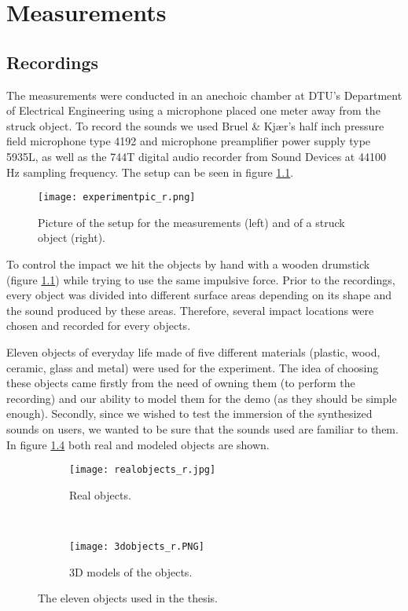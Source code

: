 \chapter{Measurements}\label{ch:measurements}

\section{Recordings}\label{sec:recordings}

The measurements were conducted in an anechoic chamber at DTU's Department of Electrical Engineering using a microphone placed one meter away from the struck object. To record the sounds we used Bruel \& Kjær's half inch pressure field microphone type 4192 and microphone preamplifier power supply type 5935L, as well as the 744T digital audio recorder from Sound Devices at 44100 Hz sampling frequency. The setup can be seen in figure \ref{fig:experiment}.

\begin{figure}[H]
  \centering
    \texttt{[image: experimentpic\_r.png]}
      \caption{Picture of the setup for the measurements (left) and of a struck object (right).}\label{fig:experiment}
\end{figure}

To control the impact we hit the objects by hand with a wooden drumstick (figure \ref{fig:experiment}) while trying to use the same impulsive force. Prior to the recordings, every object was divided into different surface areas depending on its shape and the sound produced by these areas. Therefore, several impact locations were chosen and recorded for every objects.

Eleven objects of everyday life made of five different materials (plastic, wood, ceramic, glass and metal) were used for the experiment. The idea of choosing these objects came firstly from the need of owning them (to perform the recording) and our ability to model them for the demo (as they should be simple enough). Secondly, since we wished to test the immersion of the synthesized sounds on users, we wanted to be sure that the sounds used are familiar to them. In figure \ref{fig:objects} both real and modeled objects are shown. 

\begin{figure}[H]
    \centering
    \begin{subfigure}[b]{0.7\textwidth}
        \texttt{[image: realobjects\_r.jpg]}
        \caption{Real objects.}
        \label{fig:real}
    \end{subfigure}
    ~ %
    \begin{subfigure}[b]{0.7\textwidth}
        \texttt{[image: 3dobjects\_r.PNG]}
        \caption{3D models of the objects.}
        \label{fig:models}
    \end{subfigure}
    \caption{The eleven objects used in the thesis.}\label{fig:objects}
\end{figure}

